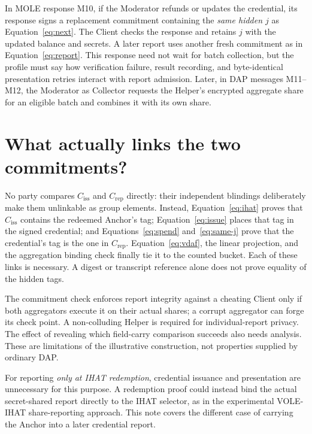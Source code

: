 \documentclass[11pt]{article}
\newcommand{\Ciss}{C_{\mathrm{iss}}}
\newcommand{\Crep}{C_{\mathrm{rep}}}
\begin{document}
In MOLE response M10, if the Moderator refunds or updates the credential,
its response signs a
replacement commitment containing the \emph{same hidden $j$} as
Equation~\eqref{eq:next}. The Client checks the response and retains $j$
with the updated balance and secrets. A later report uses another fresh
commitment as in Equation~\eqref{eq:report}. This response need not wait
for batch collection, but the profile must say how verification failure,
result recording, and byte-identical presentation retries interact with
report admission. Later, in DAP messages M11--M12, the Moderator as
Collector requests the Helper's encrypted aggregate share for an eligible
batch and combines it with its own share.

\section{What actually links the two commitments?}

No party compares $\Ciss$ and $\Crep$ directly: their independent
blindings deliberately make them unlinkable as group elements. Instead,
Equation~\eqref{eq:ihat} proves that $\Ciss$ contains the redeemed
Anchor's tag; Equation~\eqref{eq:issue} places that tag in the signed
credential; and Equations~\eqref{eq:spend} and~\eqref{eq:same-j} prove
that the credential's tag is the one in $\Crep$. Equation~\eqref{eq:vdaf},
the linear projection, and the aggregation binding check finally tie it to
the counted bucket.
Each of these links is necessary. A digest or transcript reference alone
does not prove equality of the hidden tags.

The commitment check enforces report integrity against a cheating Client
only if both aggregators execute it on their actual shares; a corrupt
aggregator can forge its check point. A non-colluding Helper is required
for individual-report privacy. The effect of revealing which field-carry
comparison succeeds also needs analysis. These are limitations of the
illustrative construction, not properties supplied by ordinary DAP.

For reporting \emph{only at IHAT redemption}, credential issuance and
presentation are unnecessary for this purpose. A redemption proof could
instead bind the actual secret-shared report directly to the IHAT selector,
as in the experimental VOLE-IHAT share-reporting approach. This note covers
the different case of carrying the Anchor into a later credential report.
\end{document}

